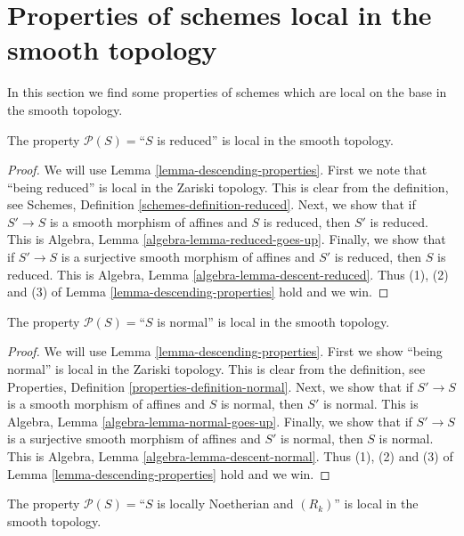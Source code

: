\section{Properties of schemes local in the smooth topology}
\label{section-descending-properties-smooth}

\noindent
In this section we find some properties of schemes which are local on the base
in the smooth topology.

\begin{lemma}
\label{lemma-reduced-local-smooth}
The property $\mathcal{P}(S) =$``$S$ is reduced'' is local in the smooth
topology.
\end{lemma}

\begin{proof}
We will use Lemma \ref{lemma-descending-properties}.
First we note that ``being reduced'' is local
in the Zariski topology. This is clear from the definition,
see Schemes, Definition \ref{schemes-definition-reduced}.
Next, we show that if $S' \to S$ is a smooth morphism of affines
and $S$ is reduced, then $S'$ is reduced. This is
Algebra, Lemma \ref{algebra-lemma-reduced-goes-up}.
Finally, we show that if $S' \to S$ is a surjective
smooth morphism of affines
and $S'$ is reduced, then $S$ is reduced. This is
Algebra, Lemma \ref{algebra-lemma-descent-reduced}.
Thus (1), (2) and (3) of Lemma \ref{lemma-descending-properties} hold
and we win.
\end{proof}

\begin{lemma}
\label{lemma-normal-local-smooth}
The property $\mathcal{P}(S) =$``$S$ is normal'' is local in the smooth
topology.
\end{lemma}

\begin{proof}
We will use Lemma \ref{lemma-descending-properties}.
First we show ``being normal'' is local
in the Zariski topology. This is clear from the definition,
see Properties, Definition \ref{properties-definition-normal}.
Next, we show that if $S' \to S$ is a smooth morphism of affines
and $S$ is normal, then $S'$ is normal. This is
Algebra, Lemma \ref{algebra-lemma-normal-goes-up}.
Finally, we show that if $S' \to S$ is a surjective
smooth morphism of affines
and $S'$ is normal, then $S$ is normal. This is
Algebra, Lemma \ref{algebra-lemma-descent-normal}.
Thus (1), (2) and (3) of Lemma \ref{lemma-descending-properties} hold
and we win.
\end{proof}

\begin{lemma}
\label{lemma-Rk-local-smooth}
The property $\mathcal{P}(S) =$``$S$ is locally Noetherian and $(R_k)$''
is local in the smooth topology.
\end{lemma}

